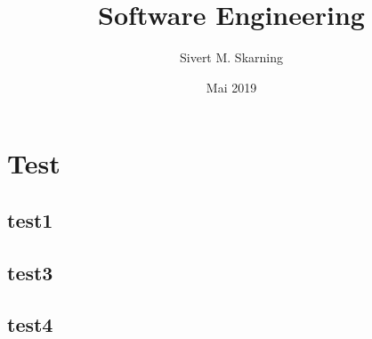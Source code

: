 \documentclass{article}
\title{Software Engineering}
\author{Sivert M. Skarning}
\date{Mai 2019}
\begin{document}
\section{Test}
\subsection{test1}
\subsection{test3}
\subsection{test4}
\end{document}
